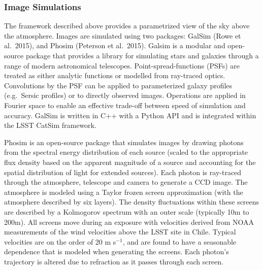 {\subsubsection{Image Simulations}
\label{sec:imsim}

The framework described above provides a parametrized view of the sky
above the atmosphere. Images are simulated using two packages: GalSim
(Rowe et al.~2015), and Phosim (Peterson et al.~2015). Galsim is a
modular and open-source package that provides a library for simulating
stars and galaxies through a range of modern astronomical
telescopes. Point-spread-functions (PSFs) are treated as either
analytic functions or modelled from ray-traced optics. Convolutions by
the PSF can be applied to parameterized galaxy profiles (e.g.\
Sersic profiles) or to directly observed images. Operations are
applied in Fourier space to enable an effective trade-off between
speed of simulation and accuracy. GalSim is written in C++ with a
Python API and is integrated within the LSST CatSim framework.

Phosim is an open-source package that simulates images by drawing
photons from the spectral energy distribution of each source (scaled
to the appropriate flux density based on the apparent magnitude of a
source and accounting for the spatial distribution of light for
extended sources). Each photon is ray-traced through the atmosphere,
telescope and camera to generate a CCD image. The atmosphere is
modeled using a Taylor frozen screen approximation (with the
atmosphere described by six layers). The density fluctuations within
these screens are described by a Kolmogorov spectrum with an outer
scale (typically 10m to 200m). All screens move during an exposure
with velocities derived from NOAA measurements of the wind velocities
above the LSST site in Chile.  Typical velocities are on the order of
20 m s$^{-1}$, and are found to have a seasonable dependence that is
modeled when generating the screens. Each photon's trajectory is
altered due to refraction as it passes through each screen.


}
